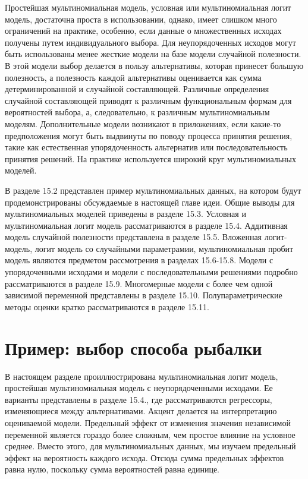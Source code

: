 Простейшая мультиномиальная модель, условная или мультиномиальная логит модель, достаточна проста в использовании, однако, имеет слишком много ограничений на практике, особенно, если данные о множественных исходах получены путем индивидуального выбора. Для неупорядоченных исходов могут быть использованы менее жесткие модели на базе модели случайной полезности. 
В этой модели выбор делается в пользу альтернативы, которая принесет большую полезность, а полезность каждой альтернативы оценивается как сумма детерминированной и случайной составляющей. Различные определения случайной составляющей приводят к  различным функциональным формам для вероятностей выбора, а, следовательно, к различным мультиномиальным моделям. Дополнительные модели возникают в приложениях, если какие-то предположения могут быть выдвинуты по поводу процесса принятия решения, такие как естественная упорядоченность альтернатив или последовательность принятия решений. На практике используется широкий круг мультиномиальных моделей.

В разделе 15.2 представлен пример мультиномиальных данных, на котором будут продемонстрированы обсуждаемые в настоящей главе идеи. Общие выводы для мультиномиальных моделей приведены в разделе 15.3. Условная и мультиномиальная логит модель рассматриваются в разделе 15.4. Аддитивная модель случайной полезности представлена в разделе 15.5. Вложенная логит-модель, логит модель со случайными параметрамии, мультиномиальная пробит модель являются предметом рассмотрения в разделах 15.6-15.8. Модели с упорядоченными исходами и модели с последовательными решениями подробно рассматриваются в разделе 15.9. Многомерные модели с более чем одной зависимой переменной представлены в разделе 15.10. Полупараметрические методы оценки кратко рассматриваются в разделе 15.11.

\section{Пример: выбор способа рыбалки}

В настоящем разделе проиллюстрирована мультиномиальная логит модель, простейшая мультиномиальная модель с неупорядоченными исходами. Ее варианты представлены в разделе 15.4., где рассматриваются регрессоры, изменяющиеся между альтернативами. Акцент делается на интерпретацию оцениваемой модели. Предельный эффект от изменения значения независимой переменной является гораздо более сложным, чем простое влияние на условное среднее. Вместо этого, для мультиномиальных данных, мы изучаем предельный эффект на вероятность каждого исхода. Отсюда сумма предельных эффектов равна нулю, поскольку сумма вероятностей равна единице.

